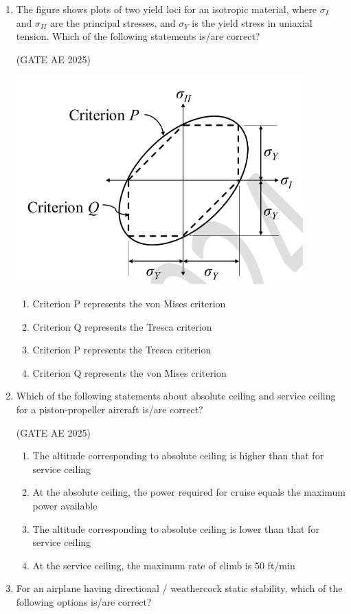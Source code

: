 \documentclass[journal,12pt,onecolumn]{IEEEtran}
\theoremstyle{remark}
\begin{document}
\begin{flushleft}
\begin{enumerate}
\item The figure shows plots of two yield loci for an isotropic material, where $\sigma_I$ and $\sigma_{II}$ are the principal stresses, and $\sigma_Y$ is the yield stress in uniaxial tension. Which of the following statements is/are correct?  

\hfill (GATE AE 2025)

\begin{center}
\includegraphics[width=0.5\columnwidth]{figs/46.png}
\end{center}

\begin{enumerate}
\item Criterion P represents the von Mises criterion  
\item Criterion Q represents the Tresca criterion  
\item Criterion P represents the Tresca criterion  
\item Criterion Q represents the von Mises criterion  
\end{enumerate} 

\item Which of the following statements about absolute ceiling and service ceiling for a piston-propeller aircraft is/are correct?  

\hfill (GATE AE 2025)

\begin{enumerate}
    \item The altitude corresponding to absolute ceiling is higher than that for service ceiling  
    \item At the absolute ceiling, the power required for cruise equals the maximum power available  
    \item The altitude corresponding to absolute ceiling is lower than that for service ceiling  
    \item At the service ceiling, the maximum rate of climb is 50 ft/min  
\end{enumerate}

\item  For an airplane having directional / weathercock static stability, which of the following options is/are correct?  


\end{enumerate}
\end{flushleft}
\end{document}
